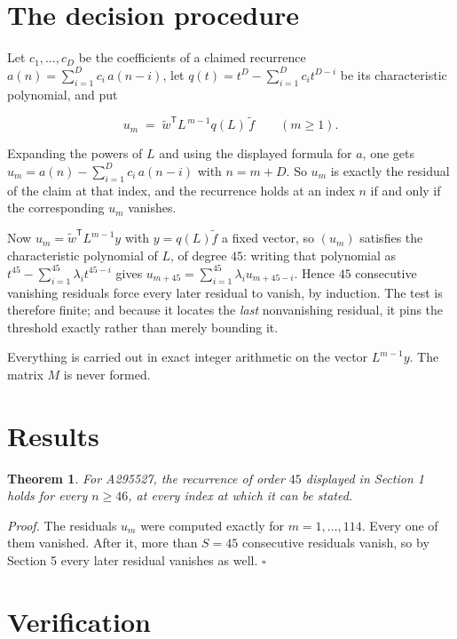 \documentclass[11pt]{article}
\newtheorem{theorem}{Theorem}
\theoremstyle{definition}
\begin{document}
\section{The decision procedure}

Let $c_1,\dots,c_D$ be the coefficients of a claimed recurrence $a(n) = \sum_{i=1}^{D} c_i\,a(n-i)$, let $q(t) = t^{D} - \sum_{i=1}^{D} c_i t^{D-i}$ be its characteristic polynomial, and put

\[u_m \;=\; \tilde w^{\mathsf T} L^{\,m-1} q(L)\,\tilde f \qquad (m \ge 1).\]

Expanding the powers of $L$ and using the displayed formula for $a$, one gets $u_m = a(n) - \sum_{i=1}^{D} c_i\,a(n-i)$ with $n = m + D$. So $u_m$ is exactly the residual of the claim at that index, and the recurrence holds at an index $n$ if and only if the corresponding $u_m$ vanishes.

Now $u_m = \tilde w^{\mathsf T} L^{m-1} y$ with $y = q(L)\tilde f$ a fixed vector, so $(u_m)$ satisfies the characteristic polynomial of $L$, of degree $45$: writing that polynomial as $t^{45} - \sum_{i=1}^{45} \lambda_i t^{45-i}$ gives $u_{m+45} = \sum_{i=1}^{45} \lambda_i u_{m+45-i}$. Hence $45$ consecutive vanishing residuals force every later residual to vanish, by induction. The test is therefore finite; and because it locates the {\itshape last} nonvanishing residual, it pins the threshold exactly rather than merely bounding it.

Everything is carried out in exact integer arithmetic on the vector $L^{m-1}y$. The matrix $M$ is never formed.

\section{Results}

\begin{theorem} For A295527, the recurrence of order $45$ displayed in Section 1 holds for every $n \ge 46$, at every index at which it can be stated.\end{theorem}

{\itshape Proof.} The residuals $u_m$ were computed exactly for $m = 1,\dots,114$. Every one of them vanished. After it, more than $S = 45$ consecutive residuals vanish, so by Section 5 every later residual vanishes as well. $\square$

\section{Verification}
\end{document}
